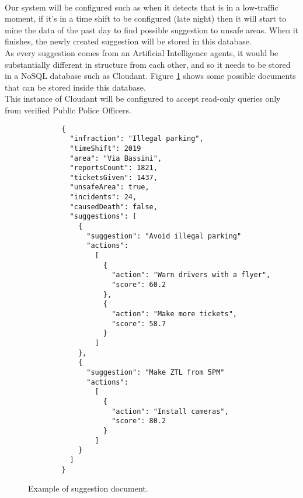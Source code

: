 \begin{itemize}
	\\Our system will be configured such as when it detects that is in a low-traffic moment, if it's in a time shift to be configured (late night) then it will start to mine the data of the past day to find possible suggestion to unsafe areas. When it finishes, the newly created suggestion will be stored in this database.
	\\As every suggestion comes from an Artificial Intelligence agents, it would be substantially different in structure from each other, and so it needs to be stored in a NoSQL database such as Cloudant. Figure \ref{fig:jsondoc} shows some possible documents that can be stored inside this database.
	\\This instance of Cloudant will be configured to accept read-only queries only from verified Public Police Officers.
	\begin{figure}[h!]
		\begin{lstlisting}
		{
		  "infraction": "Illegal parking",
		  "timeShift": 2019
		  "area": "Via Bassini",
		  "reportsCount": 1821,
		  "ticketsGiven": 1437,
		  "unsafeArea": true,
		  "incidents": 24,
		  "causedDeath": false,
		  "suggestions": [
			{
			  "suggestion": "Avoid illegal parking"
			  "actions":
			    [ 
				  {
				    "action": "Warn drivers with a flyer",
				    "score": 60.2
				  },
				  {
				    "action": "Make more tickets",
				    "score": 58.7
				  }
			    ]
			},
			{
			  "suggestion": "Make ZTL from 5PM"
			  "actions":
			    [ 
			      {
			        "action": "Install cameras",
			        "score": 80.2
			      }
			    ]
			}
		  ]
		}
		\end{lstlisting}
		\caption{Example of suggestion document.}
		\label{fig:jsondoc}
	\end{figure}
	\FloatBarrier
	
	
	\begin{comment}
	\begin{figure}[h!]
	\makebox[\textwidth]{\texttt{[image: /images/microservices/postgres.png]}}
	\caption{Scalable SafeStreets architecture to handle millions of users.}
	\end{figure}
	\FloatBarrier
	\end{comment}
	
	
	
\end{itemize}